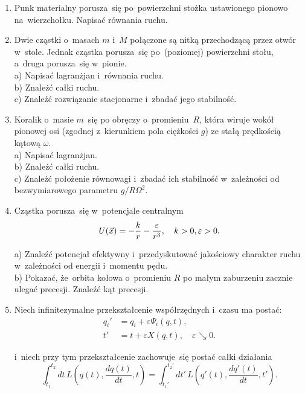 \documentclass[a4paper,11pt]{article}
\begin{document}
\begin{enumerate}
\item Punk materialny porusza~się po~powierzchni stożka ustawionego pionowo
  na~wierzchołku. Napisać równania ruchu.



\item Dwie cząstki o~masach $m$ i~$M$ połączone są nitką przechodzącą
  przez otwór w~stole. Jednak cząstka porusza~się po~(poziomej) powierzchni
  stołu, a~druga porusza~się w~pionie. \\
  a) Napisać lagranżjan i~równania ruchu. \\
  b) Znaleźć całki ruchu. \\
  c) Znaleźć rozwiązanie stacjonarne i~zbadać jego stabilność.



\item Koralik o~masie $m$~się po obręczy o~promieniu~$R$, która wiruje wokół
  pionowej osi (zgodnej z~kierunkiem pola ciężkości $g$) ze stałą prędkością
  kątową $\omega$. \\
  a) Napisać lagranżjan. \\
  b) Znaleźć całki ruchu. \\
  c) Znaleźć położenie równowagi i~zbadać ich stabilność w~zależności od
  bezwymiarowego parametru $g / R \Omega^{ 2 }$.



\item Cząstka porusza~się w~potencjale centralnym
  \begin{equation*}
    U( \vec{ x } ) = -\frac{ k }{ r } - \frac{ \varepsilon }{ r^{ 3 } }, \quad
    k > 0, \varepsilon > 0.
  \end{equation*}

  a) Znaleźć potencjał efektywny i~przedyskutować jakościowy charakter
  ruchu w~zależności od energii i~momentu pędu. \\
  b) Pokazać, że~orbita kołowa o~promieniu $R$ po małym zaburzeniu zacznie
  ulegać precesji. Znaleźć kąt precesji.



\item Niech infinitezymalne przekształcenie współrzędnych i~czasu ma
  postać:
  \begin{align*}
    q_{ i }' &= q_{ i } + \varepsilon \Psi_{ i }( q, t ), \\
    t' &= t + \varepsilon X( q, t ), \quad
         \varepsilon \searrow 0.
  \end{align*}

  i~niech przy tym przekształcenie zachowuje~się postać całki działania
  \begin{equation*}
    \int_{ t_{ 1 } }^{ t_{ 2 } } dt \, L\left( q( t ), \frac{ dq( t ) }{ dt },
      t \right) =
    \int_{ t_{ 1 }' }^{ t_{ 2 }' } dt' \, L\left( q'( t ),
      \frac{ dq'( t ) }{ dt }, t' \right).
  \end{equation*}


\end{enumerate}
\end{document}
